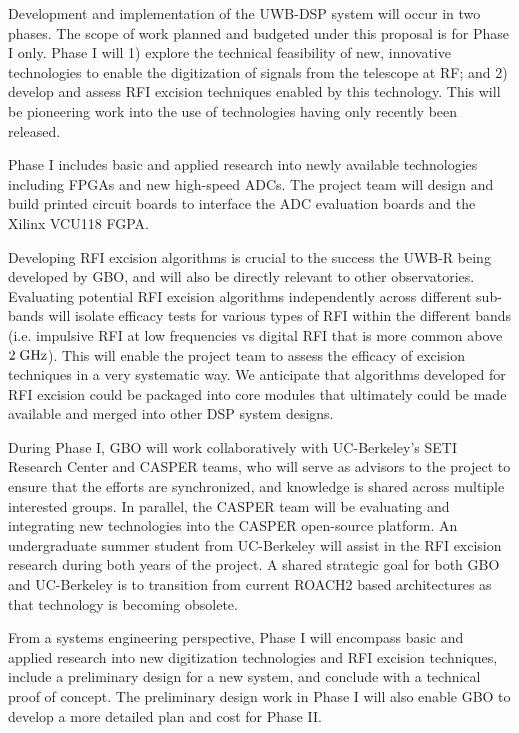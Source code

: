 \documentclass[10pt]{myNSF}
\begin{document}
Development and implementation of the UWB-DSP system will occur in two
phases. The scope of work planned and budgeted under this proposal is
for Phase {\sc I} only. Phase {\sc I} will 1) explore the technical
feasibility of new, innovative technologies to enable the digitization
of signals from the telescope at RF; and 2) develop and assess RFI
excision techniques enabled by this technology. This will be
pioneering work into the use of technologies having only recently been
released. 

Phase {\sc I} includes basic and applied research into newly available
technologies including FPGAs and new high-speed ADCs. The project team
will design and build printed circuit boards to interface the ADC
evaluation boards and the Xilinx VCU118 FGPA.


Developing RFI excision algorithms is crucial to the success the UWB-R
being developed by GBO, and will also be directly relevant to other
observatories. Evaluating potential RFI excision algorithms
independently across different sub-bands will isolate efficacy tests
for various types of RFI within the different bands (i.e. impulsive
RFI at low frequencies vs digital RFI that is more common above $2\;
\textrm{GHz}$). This will enable the project team to assess the efficacy of
excision techniques in a very systematic way. We anticipate that
algorithms developed for RFI excision could be packaged into core
modules that ultimately could be made available and merged into other
DSP system designs.

During Phase {\sc I}, GBO will work collaboratively with UC-Berkeley’s
SETI Research Center and CASPER teams, who will serve as advisors to
the project to ensure that the efforts are synchronized, and knowledge
is shared across multiple interested groups. In parallel, the CASPER
team will be evaluating and integrating new technologies into the
CASPER open-source platform. An undergraduate summer student from
UC-Berkeley will assist in the RFI excision research during both years
of the project. A shared strategic goal for both GBO and UC-Berkeley
is to transition from current ROACH2 based architectures as that
technology is becoming obsolete.

From a systems engineering perspective, Phase {\sc I} will encompass
basic and applied research into new digitization technologies and RFI
excision techniques, include a preliminary design for a new system,
and conclude with a technical proof of concept. The preliminary design
work in Phase {\sc I} will also enable GBO to develop a more detailed
plan and cost for Phase {\sc II}.
\end{document}
